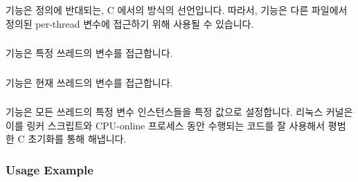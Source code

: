 {{{{\subsubsection{}

 기능은 정의에 반대되는, C 에서의 방식의 선언입니다.
따라서,  기능은 다른 파일에서 정의된 per-thread 변수에
접근하기 위해 사용될 수 있습니다.

\subsubsection{}

 기능은 특정 쓰레드의 변수를 접근합니다.

\subsubsection{}

 기능은 현재 쓰레드의 변수를 접근합니다.

\subsubsection{}

 기능은 모든 쓰레드의 특정 변수 인스턴스들을 특정 값으로
설정합니다.
리눅스 커널은 이를 링커 스크립트와 CPU-online 프로세스 동안 수행되는 코드를 잘
사용해서 평범한 C 초기화를 통해 해냅니다.

\subsubsection{Usage Example}

}}}}
